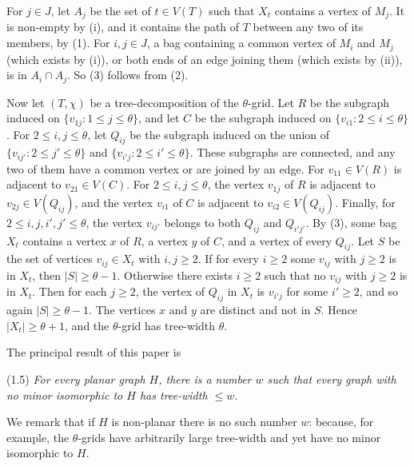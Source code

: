 {For $j \in J$, let $A_j$ be the set of $t \in V(T)$ such that $X_t$ contains a vertex of $M_j$. It is
non-empty by (i), and it contains the path of $T$ between any two of its members, by (1). For
$i, j \in J$, a bag containing a common vertex of $M_i$ and $M_j$ (which exists by (i)), or both
ends of an edge joining them (which exists by (ii)), is in $A_i \cap A_j$. So (3) follows from (2).

Now let $(T, \chi)$ be a tree-decomposition of the $\theta$-grid. Let $R$ be the subgraph induced
on $\{v_{1j} : 1 \le j \le \theta\}$, and let $C$ be the subgraph induced on
$\{v_{i1} : 2 \le i \le \theta\}$. For $2 \le i, j \le \theta$, let $Q_{ij}$ be the subgraph
induced on the union of $\{v_{ij'} : 2 \le j' \le \theta\}$ and $\{v_{i'j} : 2 \le i' \le \theta\}$.
These subgraphs are connected, and any two of them have a common vertex or are joined by an edge.
For $v_{11} \in V(R)$ is adjacent to $v_{21} \in V(C)$. For $2 \le i, j \le \theta$, the vertex
$v_{1j}$ of $R$ is adjacent to $v_{2j} \in V(Q_{ij})$, and the vertex $v_{i1}$ of $C$ is adjacent to
$v_{i2} \in V(Q_{ij})$. Finally, for $2 \le i, j, i', j' \le \theta$, the vertex $v_{ij'}$ belongs to
both $Q_{ij}$ and $Q_{i'j'}$. By (3), some bag $X_t$ contains a vertex $x$ of $R$, a vertex $y$ of $C$, and a vertex of every
$Q_{ij}$. Let $S$ be the set of vertices $v_{ij} \in X_t$ with $i, j \ge 2$. If for every
$i \ge 2$ some $v_{ij}$ with $j \ge 2$ is in $X_t$, then $|S| \ge \theta - 1$. Otherwise there
exists $i \ge 2$ such that no $v_{ij}$ with $j \ge 2$ is in $X_t$. Then for each $j \ge 2$, the
vertex of $Q_{ij}$ in $X_t$ is $v_{i'j}$ for some $i' \ge 2$, and so again $|S| \ge \theta - 1$.
The vertices $x$ and $y$ are distinct and not in $S$. Hence $|X_t| \ge \theta + 1$, and the
$\theta$-grid has tree-width $\theta$.}

The principal result of this paper is

\stmt
(1.5) \textit{For every planar graph $H$, there is a number $w$ such that every  graph with no minor isomorphic to $H$ has tree-width $\le w$.}

We remark that if $H$ is non-planar there is no such number $w$: because, for example, the $\theta$-grids have arbitrarily large tree-width and yet have no minor isomorphic to $H$.

